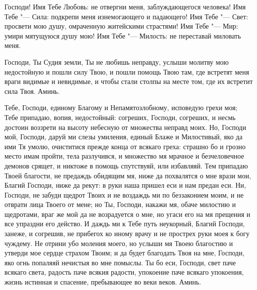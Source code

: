 \mychapterending


\begin{mymulticols}





Господи! Имя Тебе Любовь: не отвергни меня, заблуждающегося человека! Имя Тебе "--- Сила: подкрепи меня изнемогающего и падающего! Имя Тебе "--- Свет: просвети мою душу, омраченную житейскими страстями! Имя Тебе "--- Мир: умири мятущуюся душу мою! Имя Тебе "--- Милость: не переставай миловать меня.




Господи, Ты Судия земли, Ты не любишь неправду, услыши молитву мою недостойную и пошли силу Твою, и пошли помощь Твою там, где встретят меня враги видимые и невидимые, и чтобы стали столпы на месте том, где их встретит сила Твоя. Аминь.




Тебе, Господи, единому Благому и Непамятозлобному, исповедую грехи моя; Тебе припадаю, вопия, недостойный: согреших, Господи, согреших, и несмь достоин воззрети на высоту небесную от множества неправд моих. Но, Господи мой, Господи, даруй ми слезы умиления, единый Блаже и Милостивый, яко да ими Тя умолю, очиститися прежде конца от всякаго греха: страшно бо и грозно место имам пройти, тела разлучився, и множество мя мрачное и безчеловечное демонов срящет, и никтоже в помощь спутствуяй, или избавляяй. Тем припадаю Твоей благости, не предаждь обидящим мя, ниже да похвалятся о мне врази мои, Благий Господи, ниже да рекут: в руки наша пришел еси и нам предан еси. Ни, Господи, не забуди щедрот Твоих и не воздаждь ми по беззаконием моим, и не отврати лица Твоего от мене; но Ты, Господи, накажи мя, обаче милостию и щедротами, враг же мой да не возрадуется о мне, но угаси его на мя прещения и все упраздни его действо. И даждь ми к Тебе путь неукорный, Благий Господи, занеже, и согрешив, не прибегох ко иному врачу и не прострех руки моея к богу чуждему. Не отрини убо моления моего, но услыши мя Твоею благостию и утверди мое сердце страхом Твоим; и да будет благодать Твоя на мне, Господи, яко огнь попаляяй нечистыя во мне помыслы. Ты бо еси, Господи, свет паче всякаго света, радость паче всякия радости, упокоение паче всякаго упокоения, жизнь истинная и спасение, пребывающее во веки веков. Аминь.

\end{mymulticols}

